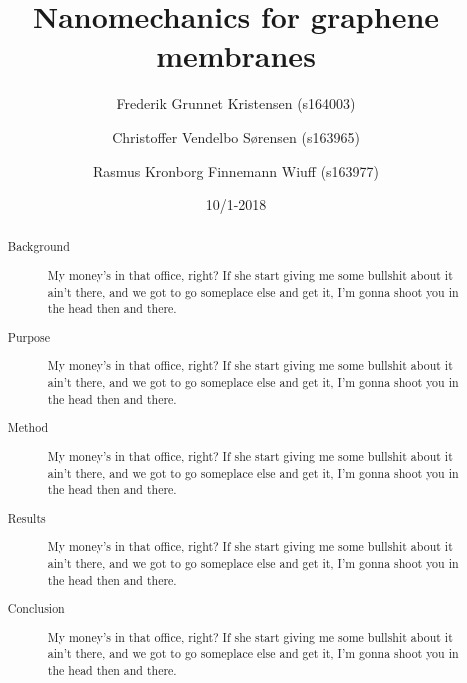 



\begin{abstract}
  \begin{description}
    \item[Background] My money's in that office, right? If she start giving me some bullshit about it ain't there, and we got to go someplace else and get it, I'm gonna shoot you in the head then and there.
    \item[Purpose] My money's in that office, right? If she start giving me some bullshit about it ain't there, and we got to go someplace else and get it, I'm gonna shoot you in the head then and there.
    \item[Method] My money's in that office, right? If she start giving me some bullshit about it ain't there, and we got to go someplace else and get it, I'm gonna shoot you in the head then and there.
    \item[Results] My money's in that office, right? If she start giving me some bullshit about it ain't there, and we got to go someplace else and get it, I'm gonna shoot you in the head then and there.
    \item[Conclusion] My money's in that office, right? If she start giving me some bullshit about it ain't there, and we got to go someplace else and get it, I'm gonna shoot you in the head then and there.
  \end{description}
\end{abstract}

\title{Nanomechanics for graphene membranes}
\date{10/1-2018}
\author{Frederik Grunnet Kristensen (s164003)}
\author{Christoffer Vendelbo Sørensen (s163965)}
\author{Rasmus Kronborg Finnemann Wiuff (s163977)}

\maketitle


\tableofcontents
\thispagestyle{empty}
\newpage
\setcounter{page}{1}






\newpage




\newpage
\listoffigures
\listoftables
\newpage


